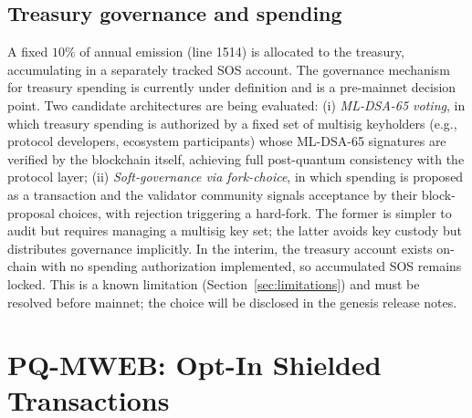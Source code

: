 \documentclass[11pt]{article}
\newcommand{\mldsa}{ML\mbox{-}DSA\mbox{-}65}
\theoremstyle{plain}
\theoremstyle{definition}
\theoremstyle{remark}
\begin{document}
\subsection{Treasury governance and spending}
\label{sec:treasury}

A fixed $10\%$ of annual emission (line 1514) is allocated to the treasury,
accumulating in a separately tracked SOS account. The governance mechanism for
treasury spending is currently under definition and is a pre-mainnet decision
point. Two candidate architectures are being evaluated: (i) \emph{ML-DSA-65 voting},
in which treasury spending is authorized by a fixed set of multisig keyholders
(e.g., protocol developers, ecosystem participants) whose \mldsa{} signatures
are verified by the blockchain itself, achieving full post-quantum consistency
with the protocol layer; (ii) \emph{Soft-governance via fork-choice}, in which
spending is proposed as a transaction and the validator community signals
acceptance by their block-proposal choices, with rejection triggering a
hard-fork. The former is simpler to audit but requires managing a multisig key
set; the latter avoids key custody but distributes governance implicitly. In the
interim, the treasury account exists on-chain with no spending authorization
implemented, so accumulated SOS remains locked. This is a known limitation
(Section~\ref{sec:limitations}) and must be resolved before mainnet; the choice
will be disclosed in the genesis release notes.

\section{PQ-MWEB: Opt-In Shielded Transactions}
\label{sec:privacy}
\end{document}
